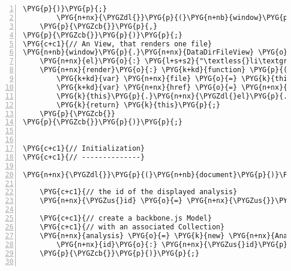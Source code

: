 \begin{Verbatim}[commandchars=\\\{\},numbers=left,firstnumber=1,stepnumber=5]
        \PYG{p}{)}\PYG{p}{;}
        \PYG{n+nx}{\PYGZdl{}}\PYG{p}{(}\PYG{n+nb}{window}\PYG{p}{)}\PYG{p}{.}\PYG{n+nx}{scrollspy}\PYG{p}{(}\PYG{l+s+s1}{'refresh'}\PYG{p}{)}\PYG{p}{;}
    \PYG{p}{\PYGZcb{}}\PYG{p}{,}
\PYG{p}{\PYGZcb{}}\PYG{p}{)}\PYG{p}{;}
\PYG{c+c1}{// An View, that renders one file}
\PYG{n+nb}{window}\PYG{p}{.}\PYG{n+nx}{DataDirFileView} \PYG{o}{=} \PYG{n+nx}{Backbone}\PYG{p}{.}\PYG{n+nx}{View}\PYG{p}{.}\PYG{n+nx}{extend}\PYG{p}{(}\PYG{p}{\PYGZob{}}
    \PYG{n+nx}{el}\PYG{o}{:} \PYG{l+s+s2}{"\textless{}li\textgreater{}"}\PYG{p}{,}
    \PYG{n+nx}{render}\PYG{o}{:} \PYG{k+kd}{function} \PYG{p}{(}\PYG{n+nx}{model}\PYG{p}{)} \PYG{p}{\PYGZob{}}
        \PYG{k+kd}{var} \PYG{n+nx}{file} \PYG{o}{=} \PYG{k}{this}\PYG{p}{.}\PYG{n+nx}{model}\PYG{p}{.}\PYG{n+nx}{toJSON}\PYG{p}{(}\PYG{p}{)}\PYG{p}{;}
        \PYG{k+kd}{var} \PYG{n+nx}{href} \PYG{o}{=} \PYG{n+nx}{\PYGZus{}id} \PYG{o}{+} \PYG{l+s+s1}{'/files/'} \PYG{o}{+} \PYG{n+nx}{file}\PYG{p}{.}\PYG{n+nx}{path}\PYG{p}{;}
        \PYG{k}{this}\PYG{p}{.}\PYG{n+nx}{\PYGZdl{}el}\PYG{p}{.}\PYG{n+nx}{html}\PYG{p}{(}\PYG{n+nx}{el}\PYG{p}{.}\PYG{n+nx}{a}\PYG{p}{(}\PYG{p}{\PYGZob{}}\PYG{n+nx}{href}\PYG{o}{:} \PYG{n+nx}{href}\PYG{p}{\PYGZcb{}}\PYG{p}{,} \PYG{n+nx}{file}\PYG{p}{.}\PYG{n+nx}{path}\PYG{p}{)}\PYG{p}{)}\PYG{p}{;}
        \PYG{k}{return} \PYG{k}{this}\PYG{p}{;}
    \PYG{p}{\PYGZcb{}}
\PYG{p}{\PYGZcb{}}\PYG{p}{)}\PYG{p}{;}


\PYG{c+c1}{// Initialization}
\PYG{c+c1}{// --------------}

\PYG{n+nx}{\PYGZdl{}}\PYG{p}{(}\PYG{n+nb}{document}\PYG{p}{)}\PYG{p}{.}\PYG{n+nx}{ready}\PYG{p}{(}\PYG{k+kd}{function} \PYG{p}{(}\PYG{p}{)} \PYG{p}{\PYGZob{}}

    \PYG{c+c1}{// the id of the displayed analysis}
    \PYG{n+nx}{\PYGZus{}id} \PYG{o}{=} \PYG{n+nx}{\PYGZus{}}\PYG{p}{(}\PYG{n+nb}{window}\PYG{p}{.}\PYG{n+nx}{location}\PYG{p}{.}\PYG{n+nx}{pathname}\PYG{p}{.}\PYG{n+nx}{split}\PYG{p}{(}\PYG{l+s+s1}{'/'}\PYG{p}{)}\PYG{p}{)}\PYG{p}{.}\PYG{n+nx}{last}\PYG{p}{(}\PYG{p}{)}\PYG{p}{;}

    \PYG{c+c1}{// create a backbone.js Model}
    \PYG{c+c1}{// with an associated Collection}
    \PYG{n+nx}{analysis} \PYG{o}{=} \PYG{k}{new} \PYG{n+nx}{Analysis}\PYG{p}{(}\PYG{p}{\PYGZob{}}
        \PYG{n+nx}{id}\PYG{o}{:} \PYG{n+nx}{\PYGZus{}id}\PYG{p}{,}
    \PYG{p}{\PYGZcb{}}\PYG{p}{)}\PYG{p}{;}


\end{Verbatim}
